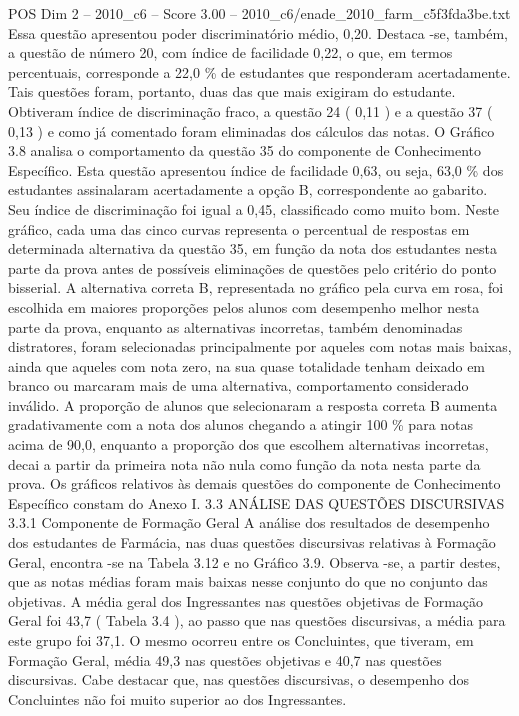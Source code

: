 \begin{textsample}{POS Dim 2 – 2010\_c6 – Score 3.00 – 2010\_c6/enade\_2010\_farm\_c5f3fda3be.txt}
Essa questão apresentou poder discriminatório médio, 0,20.
Destaca -se, também, a questão de número 20, com índice de facilidade 0,22, o que, em termos percentuais, corresponde a 22,0 \% de estudantes que responderam acertadamente.
Tais questões foram, portanto, duas das que mais exigiram do estudante.
Obtiveram índice de discriminação fraco, a questão 24 ( 0,11 ) e a questão 37 ( 0,13 ) e como já comentado foram eliminadas dos cálculos das notas.
O Gráfico 3.8 analisa o comportamento da questão 35 do componente de Conhecimento Específico.
Esta questão apresentou índice de facilidade 0,63, ou seja, 63,0 \% dos estudantes assinalaram acertadamente a opção B, correspondente ao gabarito.
Seu índice de discriminação foi igual a 0,45, classificado como muito bom.
Neste gráfico, cada uma das cinco curvas representa o percentual de respostas em determinada alternativa da questão 35, em função da nota dos estudantes nesta parte da prova antes de possíveis eliminações de questões pelo critério do ponto bisserial.
A alternativa correta B, representada no gráfico pela curva em rosa, foi escolhida em maiores proporções pelos alunos com desempenho melhor nesta parte da prova, enquanto as alternativas incorretas, também denominadas distratores, foram selecionadas principalmente por aqueles com notas mais baixas, ainda que aqueles com nota zero, na sua quase totalidade tenham deixado em branco ou marcaram mais de uma alternativa, comportamento considerado inválido.
A proporção de alunos que selecionaram a resposta correta B aumenta gradativamente com a nota dos alunos chegando a atingir 100 \% para notas acima de 90,0, enquanto a proporção dos que escolhem alternativas incorretas, decai a partir da primeira nota não nula como função da nota nesta parte da prova.
Os gráficos relativos às demais questões do componente de Conhecimento Específico constam do Anexo I. 3.3 ANÁLISE DAS QUESTÕES DISCURSIVAS 3.3.1 Componente de Formação Geral A análise dos resultados de desempenho dos estudantes de Farmácia, nas duas questões discursivas relativas à Formação Geral, encontra -se na Tabela 3.12 e no Gráfico 3.9.
Observa -se, a partir destes, que as notas médias foram mais baixas nesse conjunto do que no conjunto das objetivas.
A média geral dos Ingressantes nas questões objetivas de Formação Geral foi 43,7 ( Tabela 3.4 ), ao passo que nas questões discursivas, a média para este grupo foi 37,1.
O mesmo ocorreu entre os Concluintes, que tiveram, em Formação Geral, média 49,3 nas questões objetivas e 40,7 nas questões discursivas.
Cabe destacar que, nas questões discursivas, o desempenho dos Concluintes não foi muito superior ao dos Ingressantes.

\end{textsample}
